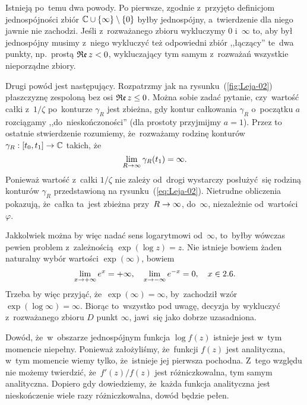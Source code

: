 \documentclass[a4paper,11pt]{article}
\begin{document}
Istnieją po~temu dwa powody. Po pierwsze, zgodnie z~przyjęto
definicjom jednospójności zbiór
$\mathbb{C} \cup \{  \infty  \} \setminus \{  0  \}$ byłby jednospójny,
a~twierdzenie dla niego jawnie nie zachodzi. Jeśli z~rozważanego
zbioru wykluczymy $0$ i~$\infty$ to, aby był jednospójny musimy
z~niego wykluczyć też odpowiedni zbiór ,,łączący'' te~dwa punkty,
np.~prostą $\mathfrak{Re}\, z < 0$, wykluczający tym samym z~rozważań
wszystkie nieporządne zbiory.

Drugi powód jest następujący. Rozpatrzmy jak na
rysunku~(\ref{fig:Leja-02}) płaszczyznę zespoloną bez osi
$\mathfrak{Re}\, z \leq 0$. Można sobie zadać pytanie, czy~wartość całki
z~$1 / \zeta$ po~konturze $\gamma_{ R }$ jest zbieżna, gdy kontur
całkowania $\gamma_{ R }$ o~początku $a$ rozciągamy
,,do~nieskończoności'' (dla prostoty przyjmijmy $a = 1$). Przez to
ostatnie stwierdzenie rozumiemy, że~rozważamy rodzinę konturów
$\gamma_{ R }: [ t_{ 0 }, t_{ 1 } ] \to \mathbb{C}$ takich, że
\begin{equation}
  \label{eq:Leja-37}
  \lim\limits_{ R \to \infty } \gamma_{ R }( t_{ 1 } ) = \infty.
\end{equation}
Ponieważ wartość z~całki $1 / \zeta$ nie zależy od~drogi wystarczy
posłużyć~się rodziną konturów $\gamma_{ R }$ przedstawioną na
rysunku~(\ref{eq:Leja-02}). Nietrudne obliczenia pokazują, że~całka
ta~jest zbieżna przy~$R \to \infty$, do~$\infty$, niezależnie
od~wartości~$\varphi$.

Jakkolwiek można by więc nadać sens logarytmowi od~$\infty$, to~byłby
wówczas pewien problem z~zależnością $\exp( \log z ) = z$. Nie
istnieje bowiem żaden naturalny wybór wartości $\exp( \infty )$,
bowiem
\begin{equation}
  \label{eq:Leja-38}
  \begin{split}
    \lim\limits_{ x \to +\infty } e^{ x } = +\infty, \quad \lim\limits_{ x \to -\infty } e^{
      -x } = 0, \quad x \in 2.6.
  \end{split}
\end{equation}
Trzeba by więc przyjąć, że~$\exp( \infty ) = \infty$, by~zachodził
wzór $\exp( \log \infty ) = \infty$. Biorąc to~wszystko pod uwagę,
decyzja by wykluczyć z~rozważanego zbioru $D$ punkt $\infty$, jawi~się
jako dobrze uzasadniona.

\vspace{\spaceFour}


\start {} Dowód, że~w~obszarze jednospójnym funkcja
$\log f( z )$ istnieje jest w~tym momencie niepełny. Ponieważ
założyliśmy, że~funkcji $f( z )$ jest analityczna, w~tym momencie
wiemy tylko, że~istnieje jej pierwsza pochodna. Z~tego względu nie
możemy twierdzić, że~$f'( z ) / f( z )$ jest różniczkowalna, tym samym
analityczna. Dopiero gdy dowiedziemy, że~każda funkcja analityczna
jest nieskończenie wiele razy różniczkowalna, dowód będzie pełen.
\end{document}
